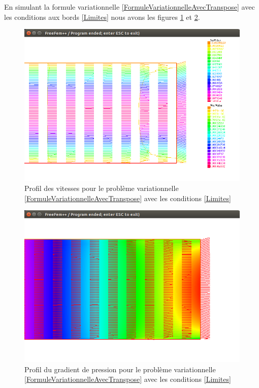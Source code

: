 \documentclass[11pt,a4paper]{article}
\numberwithin{equation}{subsection}
\numberwithin{figure}{subsection}
\begin{document}
En simulant la formule variationnelle \ref{FormuleVariationnelleAvecTranspose} avec les conditions aux bords \ref{Limites} nous avons les figures \ref{StokesLimitesTransposeVitesses} et \ref{StokesLimitesTransposePression}.

\begin{figure}[h]
\centering
\includegraphics[scale=0.4]{StokesConditionsTransposeVitesses.png}
\caption{Profil des vitesses pour le problème variationnelle \ref{FormuleVariationnelleAvecTranspose} avec les conditions \ref{Limites}}
\label{StokesLimitesTransposeVitesses}
\end{figure}

\begin{figure}[h]
\centering
\includegraphics[scale=0.4]{StokesConditionsTransposePression.png}
\caption{Profil du gradient de pression pour le problème variationnelle \ref{FormuleVariationnelleAvecTranspose} avec les conditions \ref{Limites}}
\label{StokesLimitesTransposePression}
\end{figure}
\end{document}
